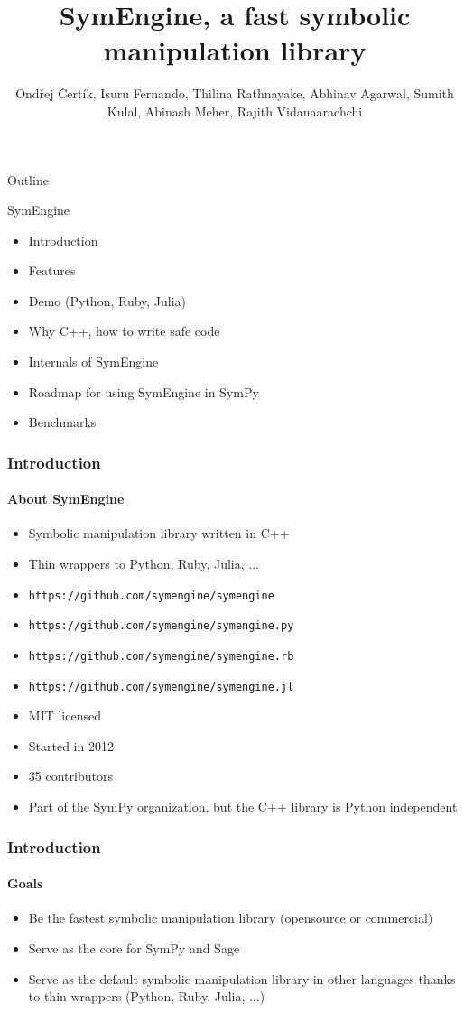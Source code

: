 \documentclass{beamer}
\title[SymEngine \hspace{14em}\insertframenumber/
\inserttotalframenumber]{SymEngine, a fast symbolic manipulation library}
\author[O. Čertík, I. Fernando, ...]{Ondřej Čertík, Isuru Fernando, Thilina Rathnayake, Abhinav Agarwal, Sumith Kulal, Abinash Meher, Rajith Vidanaarachchi}
\begin{document}
\begin{frame}
\maketitle
\end{frame}


\begin{frame}{Outline}
\begin{block}{SymEngine}
\begin{itemize}
\item Introduction
\item Features
\item Demo (Python, Ruby, Julia)
\item Why C++, how to write safe code
\item Internals of SymEngine
\item Roadmap for using SymEngine in SymPy
\item Benchmarks
\end{itemize}
\end{block}
\end{frame}


\begin{frame}
\frametitle{Introduction}
\framesubtitle{About SymEngine}
\begin{itemize}
\item Symbolic manipulation library written in C++
\item Thin wrappers to Python, Ruby, Julia, ...
\item \texttt{https://github.com/symengine/symengine}
\item \texttt{https://github.com/symengine/symengine.py}
\item \texttt{https://github.com/symengine/symengine.rb}
\item \texttt{https://github.com/symengine/symengine.jl}
\item MIT licensed
\item Started in 2012
\item 35 contributors
\item Part of the SymPy organization, but the C++ library is Python independent
\end{itemize}
\end{frame}


\begin{frame}
\frametitle{Introduction}
\framesubtitle{Goals}
\begin{itemize}
\item Be the fastest symbolic manipulation library (opensource or commercial)
\item Serve as the core for SymPy and Sage
\item Serve as the default symbolic manipulation library in other languages
    thanks to thin wrappers (Python, Ruby, Julia, ...)
\end{itemize}
\end{frame}
\end{document}
